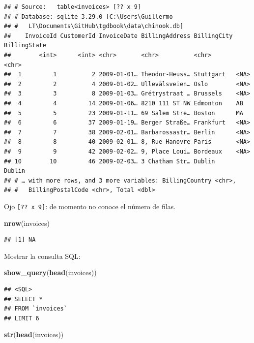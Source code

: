 \documentclass[]{book}
\newenvironment{Shaded}{\begin{snugshade}}{\end{snugshade}}
\newcommand{\KeywordTok}[1]{\textcolor[rgb]{0.13,0.29,0.53}{\textbf{#1}}}
\newcommand{\NormalTok}[1]{#1}
\begin{document}
\begin{verbatim}
## # Source:   table<invoices> [?? x 9]
## # Database: sqlite 3.29.0 [C:\Users\Guillermo
## #   LT\Documents\GitHub\tgdbook\data\chinook.db]
##    InvoiceId CustomerId InvoiceDate BillingAddress BillingCity BillingState
##        <int>      <int> <chr>       <chr>          <chr>       <chr>       
##  1         1          2 2009-01-01… Theodor-Heuss… Stuttgart   <NA>        
##  2         2          4 2009-01-02… Ullevålsveien… Oslo        <NA>        
##  3         3          8 2009-01-03… Grétrystraat … Brussels    <NA>        
##  4         4         14 2009-01-06… 8210 111 ST NW Edmonton    AB          
##  5         5         23 2009-01-11… 69 Salem Stre… Boston      MA          
##  6         6         37 2009-01-19… Berger Straße… Frankfurt   <NA>        
##  7         7         38 2009-02-01… Barbarossastr… Berlin      <NA>        
##  8         8         40 2009-02-01… 8, Rue Hanovre Paris       <NA>        
##  9         9         42 2009-02-02… 9, Place Loui… Bordeaux    <NA>        
## 10        10         46 2009-02-03… 3 Chatham Str… Dublin      Dublin      
## # … with more rows, and 3 more variables: BillingCountry <chr>,
## #   BillingPostalCode <chr>, Total <dbl>
\end{verbatim}

Ojo \texttt{{[}??\ x\ 9{]}}: de momento no conoce el número de filas.

\begin{Shaded}
\begin{Highlighting}[]
\KeywordTok{nrow}\NormalTok{(invoices)}
\end{Highlighting}
\end{Shaded}

\begin{verbatim}
## [1] NA
\end{verbatim}

Mostrar la consulta SQL:

\begin{Shaded}
\begin{Highlighting}[]
\KeywordTok{show_query}\NormalTok{(}\KeywordTok{head}\NormalTok{(invoices))}
\end{Highlighting}
\end{Shaded}

\begin{verbatim}
## <SQL>
## SELECT *
## FROM `invoices`
## LIMIT 6
\end{verbatim}

\begin{Shaded}
\begin{Highlighting}[]
\KeywordTok{str}\NormalTok{(}\KeywordTok{head}\NormalTok{(invoices))}
\end{Highlighting}
\end{Shaded}
\end{document}
